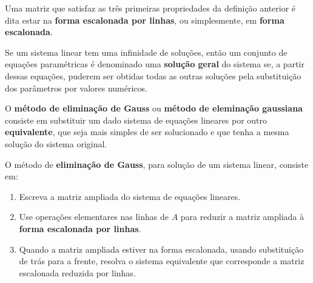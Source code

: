 \documentclass{beamer}
\begin{document}
    \begin{frame}
        \begin{observacao}
            Uma matriz que satisfaz as três primeiras propriedades da definição anterior \pause é dita estar na \textbf{forma escalonada por linhas}, \pause ou simplesmente, em \textbf{forma escalonada}.
        \end{observacao}
    \end{frame}


\begin{frame}
    \begin{definicao}
        Se um sistema linear tem uma infinidade de soluções, \pause então um conjunto de equações paramétricas \pause é denominado uma \textbf{solução geral} \pause do sistema se, a partir dessas equações, \pause puderem ser obtidas todas as outras soluções \pause pela substituição dos parâmetros por valores numéricos.
    \end{definicao}
\end{frame}

    \begin{frame}
    O \textbf{método de eliminação de Gauss} \pause ou \textbf{método de eleminação gaussiana} \pause consiste em substituir um dado sistema de equações lineares \pause por outro \textbf{equivalente}, que seja mais simples de ser solucionado \pause e que tenha a mesma solução do sistema original.\pause

    \begin{definicao}
        O método de \textbf{eliminação de Gauss}, \pause para solução de um sistema linear, \pause consiste em:\pause
        \begin{enumerate}[label={\roman*})]
            \item Escreva a matriz ampliada do sistema de equações lineares.\pause

            \item Use operações elementares nas linhas de $A$ para reduzir a matriz ampliada à \textbf{forma escalonada por linhas}.\pause

            \item Quando a matriz ampliada estiver na forma escalonada, usando substituição de trás para a frente, \pause resolva o sistema equivalente que corresponde a matriz escalonada reduzida por linhas.
        \end{enumerate}
    \end{definicao}
\end{frame}
\end{document}
